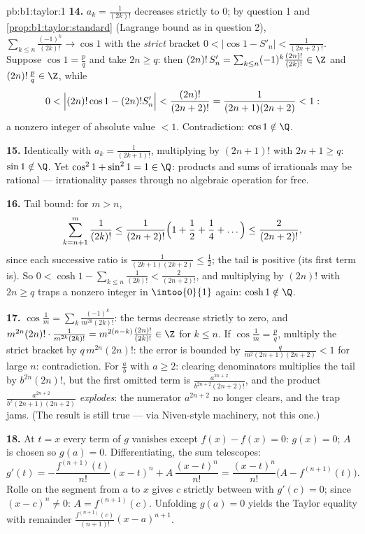 \begin{solution}{pb:b1:taylor:1}
\textbf{14.} $a_k = \frac{1}{(2k)!}$ decreases strictly to $0$;
by question 1 and \cref{prop:b1:taylor:standard} (Lagrange
bound as in question 2), $\sum_{k \leq n}\frac{(-1)^k}{(2k)!}
\to \cos 1$ with the \emph{strict} bracket $0 < \bigl|\cos 1 -
S'_n\bigr| < \frac{1}{(2n+2)!}$. Suppose $\cos 1 = \frac pq$ and
take $2n \geq q$: then $(2n)!\,S'_n = \sum_{k\leq n} (-1)^k
\frac{(2n)!}{(2k)!} \in \Z$ and $(2n)!\,\frac pq \in \Z$, while
\[
0 < \Bigl|(2n)!\cos 1 - (2n)!S'_n\Bigr| <
\frac{(2n)!}{(2n+2)!} = \frac{1}{(2n+1)(2n+2)} < 1 :
\]
a nonzero integer of absolute value $< 1$. Contradiction: $\cos
1 \notin \Q$.

\textbf{15.} Identically with $a_k = \frac{1}{(2k+1)!}$,
multiplying by $(2n+1)!$ with $2n + 1 \geq q$: $\sin 1 \notin
\Q$. Yet $\cos^2 1 + \sin^2 1 = 1 \in \Q$: products and sums of
irrationals may be rational --- irrationality passes through no
algebraic operation for free.

\textbf{16.} Tail bound: for $m > n$,
\[
\sum_{k=n+1}^{m} \frac{1}{(2k)!}
\leq \frac{1}{(2n+2)!}\Bigl(1 + \frac12 + \frac14 +
\dots\Bigr) \leq \frac{2}{(2n+2)!} ,
\]
since each successive ratio is $\frac{1}{(2k+1)(2k+2)} \leq
\frac12$; the tail is positive (its first term is). So $0 <
\cosh 1 - \sum_{k\leq n}\frac{1}{(2k)!} < \frac{2}{(2n+2)!}$,
and multiplying by $(2n)!$ with $2n \geq q$ traps a nonzero
integer in $\intoo{0}{1}$ again: $\cosh 1 \notin \Q$.

\textbf{17.} $\cos\frac1m = \sum_k
\frac{(-1)^k}{m^{2k}(2k)!}$: the terms decrease strictly to
zero, and $m^{2n}(2n)!\cdot\frac{1}{m^{2k}(2k)!} =
m^{2(n-k)}\frac{(2n)!}{(2k)!} \in \Z$ for $k \leq n$. If
$\cos\frac1m = \frac pq$, multiply the strict bracket by
$q\,m^{2n}(2n)!$: the error is bounded by
$\frac{q}{m^2(2n+1)(2n+2)} < 1$ for large $n$: contradiction.
For $\frac ab$ with $a \geq 2$: clearing denominators multiplies
the tail by $b^{2n}(2n)!$, but the first omitted term is
$\frac{a^{2n+2}}{b^{2n+2}(2n+2)!}$, and the product
$\frac{a^{2n+2}}{b^2(2n+1)(2n+2)}$ \emph{explodes}: the
numerator $a^{2n+2}$ no longer clears, and the trap jams.
(The result is still true --- via Niven-style machinery, not
this one.)

\textbf{18.} At $t = x$ every term of $g$ vanishes except $f(x)
- f(x) = 0$: $g(x) = 0$; $A$ is chosen so $g(a) = 0$.
Differentiating, the sum telescopes:
\[
g'(t) = -\frac{f^{(n+1)}(t)}{n!}(x - t)^n +
A\,\frac{(x-t)^n}{n!}
= \frac{(x-t)^n}{n!}\bigl(A - f^{(n+1)}(t)\bigr) .
\]
Rolle on the segment from $a$ to $x$ gives $c$ strictly between
with $g'(c) = 0$; since $(x - c)^n \neq 0$: $A =
f^{(n+1)}(c)$. Unfolding $g(a) = 0$ yields the Taylor equality
with remainder $\frac{f^{(n+1)}(c)}{(n+1)!}(x-a)^{n+1}$.


\end{solution}
